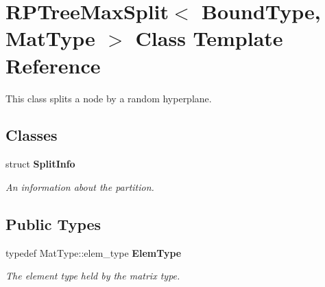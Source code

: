 \section{R\+P\+Tree\+Max\+Split$<$ Bound\+Type, Mat\+Type $>$ Class Template Reference}
\label{classmlpack_1_1tree_1_1RPTreeMaxSplit}


This class splits a node by a random hyperplane.  


\subsection*{Classes}
\begin{DoxyCompactItemize}
\item 
struct \textbf{ Split\+Info}
\begin{DoxyCompactList}\small\item\em An information about the partition. \end{DoxyCompactList}\end{DoxyCompactItemize}
\subsection*{Public Types}
\begin{DoxyCompactItemize}
\item 
typedef Mat\+Type\+::elem\+\_\+type \textbf{ Elem\+Type}
\begin{DoxyCompactList}\small\item\em The element type held by the matrix type. \end{DoxyCompactList}\end{DoxyCompactItemize}
